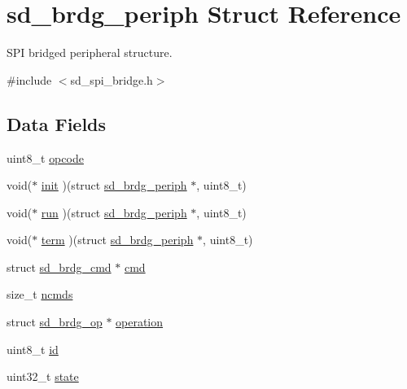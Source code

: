 \hypertarget{structsd__brdg__periph}{}\section{sd\+\_\+brdg\+\_\+periph Struct Reference}
\label{structsd__brdg__periph}


S\+PI bridged peripheral structure.  




{\ttfamily \#include $<$sd\+\_\+spi\+\_\+bridge.\+h$>$}

\subsection*{Data Fields}
\begin{DoxyCompactItemize}
\item 
uint8\+\_\+t \mbox{\hyperlink{structsd__brdg__periph_a5c1b56e6bccc2a95dbddf1a08e56e87d}{opcode}}
\item 
void($\ast$ \mbox{\hyperlink{structsd__brdg__periph_aec4538eb2e2fde52ffec4fac4a0bd319}{init}} )(struct \mbox{\hyperlink{structsd__brdg__periph}{sd\+\_\+brdg\+\_\+periph}} $\ast$, uint8\+\_\+t)
\item 
void($\ast$ \mbox{\hyperlink{structsd__brdg__periph_ab4adff8c7b7a317918d0b431eb60e072}{run}} )(struct \mbox{\hyperlink{structsd__brdg__periph}{sd\+\_\+brdg\+\_\+periph}} $\ast$, uint8\+\_\+t)
\item 
void($\ast$ \mbox{\hyperlink{structsd__brdg__periph_a3a401b0e690cda398c6ce64d867feda2}{term}} )(struct \mbox{\hyperlink{structsd__brdg__periph}{sd\+\_\+brdg\+\_\+periph}} $\ast$, uint8\+\_\+t)
\item 
struct \mbox{\hyperlink{structsd__brdg__cmd}{sd\+\_\+brdg\+\_\+cmd}} $\ast$ \mbox{\hyperlink{structsd__brdg__periph_a61d7114c96c2ffeb66ccd43c213f627a}{cmd}}
\item 
size\+\_\+t \mbox{\hyperlink{structsd__brdg__periph_ac22750af690786710910e812b5b2bbc6}{ncmds}}
\item 
struct \mbox{\hyperlink{structsd__brdg__op}{sd\+\_\+brdg\+\_\+op}} $\ast$ \mbox{\hyperlink{structsd__brdg__periph_a7458a4047dbd2051adedf73a30ce284f}{operation}}
\item 
uint8\+\_\+t \mbox{\hyperlink{structsd__brdg__periph_a1e6927fa1486224044e568f9c370519b}{id}}
\item 
uint32\+\_\+t \mbox{\hyperlink{structsd__brdg__periph_a1b0c7bd4d79798ef4e0ce23894c9aeb2}{state}}
\end{DoxyCompactItemize}


